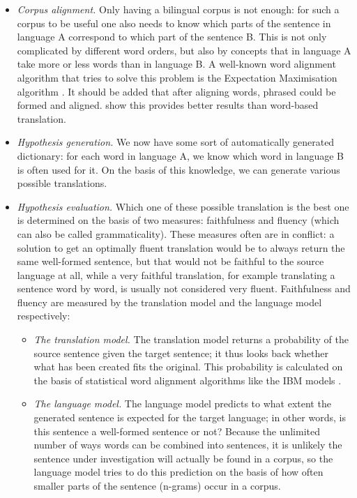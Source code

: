 \documentclass[12pt]{article}
\begin{document}
\begin{itemize}
\item \emph{Corpus alignment.} Only having a bilingual corpus is not enough: for such a corpus to be useful one also needs to know which parts of the sentence in language A correspond to which part of the sentence B. This is not only complicated by different word orders, but also by concepts that in language A take more or less words than in language B. A well-known word alignment algorithm that tries to solve this problem is the Expectation Maximisation algorithm \citep{dempster77}. It should be added that after aligning words, phrased could be formed and aligned. \citet{koehn03} show this provides better results than word-based translation.


\item \emph{Hypothesis generation.} We now have some sort of automatically generated dictionary: for each word in language A, we know which word in language B is often used for it. On the basis of this knowledge, we can generate various possible translations. 

\item \emph{Hypothesis evaluation.} Which one of these possible translation is the best one is determined on the basis of two measures: faithfulness and fluency (which can also be called grammaticality). These measures often are in conflict: a solution to get an optimally fluent translation would be to always return the same well-formed sentence, but that would not be faithful to the source language at all, while a very faithful translation, for example translating a sentence word by word, is usually not considered very fluent. Faithfulness and fluency are measured by the translation model and the language model respectively:

\begin{itemize}
\item \emph{The translation model.} The translation model returns a probability of the source sentence given the target sentence; it thus looks back whether what has been created fits the original. This probability is calculated on the basis of statistical word alignment algorithms like the IBM models \citep{brown93}.

\item \emph{The language model.} The language model predicts to what extent the generated sentence is expected for the target language; in other words, is this sentence a well-formed sentence or not? Because the unlimited number of ways words can be combined into sentences, it is unlikely the sentence under investigation will actually be found in a corpus, so the language model tries to do this prediction on the basis of how often smaller parts of the sentence (n-grams) occur in a corpus.

\end{itemize}

\end{itemize}
\end{document}
